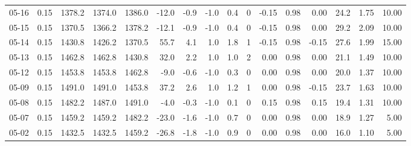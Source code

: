 \begin{threeparttable}
{\begin{tabular}{lrrrrrrrrrrrrrrr}
  05-16 &     0.15 & 1378.2 & 1374.0 & 1386.0 &      -12.0 &           -0.9 &                     -1.0 &                 0.4 &              0 &      -0.15 &      0.98 &           0.00 &             24.2 &            1.75 &                  10.00 \\
  05-15 &     0.15 & 1370.5 & 1366.2 & 1378.2 &      -12.1 &           -0.9 &                     -1.0 &                 0.4 &              0 &      -0.15 &      0.98 &           0.00 &             29.2 &            2.09 &                  10.00 \\
  05-14 &     0.15 & 1430.8 & 1426.2 & 1370.5 &       55.7 &            4.1 &                      1.0 &                 1.8 &              1 &      -0.15 &      0.98 &          -0.15 &             27.6 &            1.99 &                  15.00 \\
  05-13 &     0.15 & 1462.8 & 1462.8 & 1430.8 &       32.0 &            2.2 &                      1.0 &                 1.0 &              2 &       0.00 &      0.98 &           0.00 &             21.1 &            1.49 &                  10.00 \\
  05-12 &     0.15 & 1453.8 & 1453.8 & 1462.8 &       -9.0 &           -0.6 &                     -1.0 &                 0.3 &              0 &       0.00 &      0.98 &           0.00 &             20.0 &            1.37 &                  10.00 \\
  05-09 &     0.15 & 1491.0 & 1491.0 & 1453.8 &       37.2 &            2.6 &                      1.0 &                 1.2 &              1 &       0.00 &      0.98 &          -0.15 &             23.7 &            1.63 &                  10.00 \\
  05-08 &     0.15 & 1482.2 & 1487.0 & 1491.0 &       -4.0 &           -0.3 &                     -1.0 &                 0.1 &              0 &       0.15 &      0.98 &           0.15 &             19.4 &            1.31 &                  10.00 \\
  05-07 &     0.15 & 1459.2 & 1459.2 & 1482.2 &      -23.0 &           -1.6 &                     -1.0 &                 0.7 &              0 &       0.00 &      0.98 &           0.00 &             18.9 &            1.27 &                   5.00 \\
  05-02 &     0.15 & 1432.5 & 1432.5 & 1459.2 &      -26.8 &           -1.8 &                     -1.0 &                 0.9 &              0 &       0.00 &      0.98 &           0.00 &             16.0 &            1.10 &                   5.00 \\

\end{tabular}}
\end{threeparttable}
